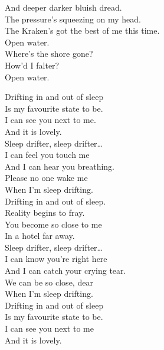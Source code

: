 And deeper darker bluish dread. \\
The pressure's squeezing on my head. \\
The Kraken's got the best of me this time. \\

Open water. \\
Where's the shore gone? \\
How'd I falter? \\
Open water. \\





Drifting in and out of sleep \\
Is my favourite state to be. \\
I can see you next to me. \\
And it is lovely. \\

Sleep drifter, sleep drifter… \\

I can feel you touch me \\
And I can hear you breathing. \\
Please no one wake me \\
When I'm sleep drifting. \\

Drifting in and out of sleep. \\
Reality begins to fray. \\
You become so close to me \\
In a hotel far away. \\

Sleep drifter, sleep drifter… \\

I can know you're right here \\
And I can catch your crying tear. \\
We can be so close, dear \\
When I'm sleep drifting. \\

Drifting in and out of sleep \\
Is my favourite state to be. \\
I can see you next to me \\
And it is lovely. \\

